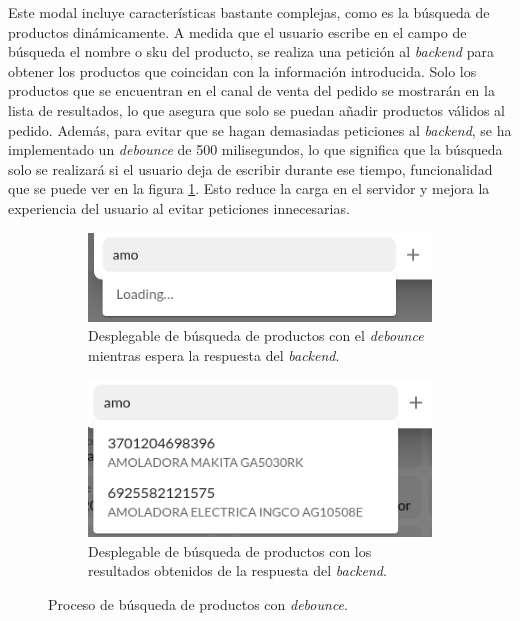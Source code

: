 Este modal incluye características bastante complejas, como es la búsqueda de productos dinámicamente. A medida que el usuario escribe en el campo de búsqueda el nombre o \gls{sku} del producto, se realiza una petición al \textit{backend} para obtener los productos que coincidan con la información introducida. Solo los productos que se encuentran en el canal de venta del pedido se mostrarán en la lista de resultados, lo que asegura que solo se puedan añadir productos válidos al pedido. Además, para evitar que se hagan demasiadas peticiones al \textit{backend}, se ha implementado un \textit{debounce} de 500 milisegundos, lo que significa que la búsqueda solo se realizará si el usuario deja de escribir durante ese tiempo, funcionalidad que se puede ver en la figura \ref{fig:dev:ss:busqueda_debounced}. Esto reduce la carga en el servidor y mejora la experiencia del usuario al evitar peticiones innecesarias.

\begin{figure}[H]
    \centering
    \begin{subfigure}{0.45\linewidth}
        \centering
        \includegraphics[width=\linewidth]{figures/design_develop/screenshots/busqueda_debounced_loading.png}
        \caption{Desplegable de búsqueda de productos con el \textit{debounce} mientras espera la respuesta del \textit{backend}.}
    \end{subfigure}
    \hfill
    \begin{subfigure}{0.45\linewidth}
        \centering
        \includegraphics[width=\linewidth]{figures/design_develop/screenshots/busqueda_debounced.png}
        \caption{Desplegable de búsqueda de productos con los resultados obtenidos de la respuesta del \textit{backend}.}
    \end{subfigure}
    \par\vspace{0.3cm}
    \caption{Proceso de búsqueda de productos con \textit{debounce}.}
    \label{fig:dev:ss:busqueda_debounced}
\end{figure}

